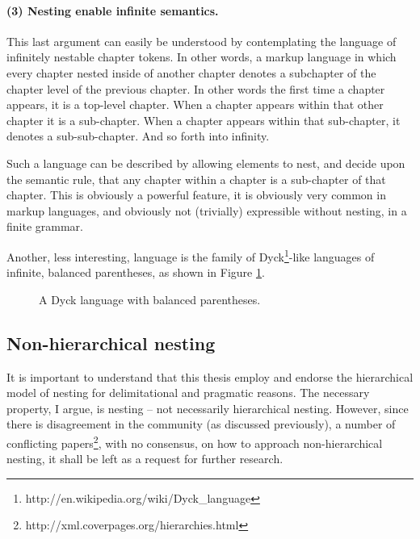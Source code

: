 \documentclass{scrreprt}
\begin{document}




\paragraph{(3) Nesting enable infinite semantics.}
This last argument can easily be understood by contemplating the language of infinitely nestable chapter tokens. In other words, a markup language in which every chapter nested inside of another chapter denotes a subchapter of the chapter level of the previous chapter. In other words the first time a chapter appears, it is a top-level chapter. When a chapter appears within that other chapter it is a sub-chapter. When a chapter appears within that sub-chapter, it denotes a sub-sub-chapter. And so forth into infinity.

Such a language can be described by allowing elements to nest, and decide upon the semantic rule, that any chapter within a chapter is a sub-chapter of that chapter. This is obviously a powerful feature, it is obviously very common in markup languages, and obviously not (trivially) expressible without nesting, in a finite grammar.

Another, less interesting, language is the family of Dyck\footnote{http://en.wikipedia.org/wiki/Dyck\_language}-like languages of infinite, balanced parentheses, as shown in Figure \ref{fig:mixed-content-nesting}.


\begin{figure}[h]
\centering
{}
\caption{A Dyck language with balanced parentheses.}
\label{fig:mixed-content-nesting}
\end{figure}







\subsection{Non-hierarchical nesting}
\label{sec:non-hierarchical-nesting}
It is important to understand that this thesis employ and endorse the hierarchical model of nesting for delimitational and pragmatic reasons. The necessary property, I argue, is nesting -- not necessarily hierarchical nesting. However, since there is disagreement in the community (as discussed previously), a number of conflicting papers\footnote{http://xml.coverpages.org/hierarchies.html}, with no consensus, on how to approach non-hierarchical nesting, it shall be left as a request for further research.
\end{document}
